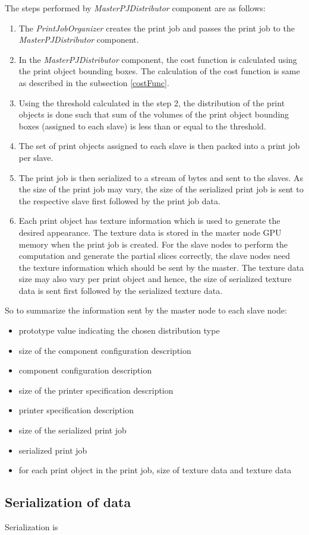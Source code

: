 The steps performed by \textit{MasterPJDistributor} component are as follows: 
\begin{enumerate}
\item The \textit{PrintJobOrganizer} creates the print job and passes the print job to the \textit{MasterPJDistributor} component. 
\item In the \textit{MasterPJDistributor} component, the cost function is calculated using the print object bounding boxes. The calculation of the cost function is same as described in the subsection \ref{costFunc}.
\item Using the threshold calculated in the step 2, the distribution of the print objects is done such that sum of the volumes of the print object bounding boxes (assigned to each slave) is less than or equal to the threshold.
\item The set of print objects assigned to each slave is then packed into a print job per slave. 
\item The print job is then serialized to a stream of bytes and sent to the slaves. As the size of the print job may vary, the size of the serialized print job is sent to the respective slave first followed by the print job data. 
\item Each print object has texture information which is used to generate the desired appearance. The texture data is stored in the master node GPU memory when the print job is created. For the slave nodes to perform the computation and generate the partial slices correctly, the slave nodes need the texture information which should be sent by the master. The texture data size may also vary per print object and hence, the size of serialized texture data is sent first followed by the serialized texture data.   
\end{enumerate}

So to summarize the information sent by the master node to each slave node:
\begin{itemize}
\item prototype value indicating the chosen distribution type
\item size of the component configuration description 
\item component configuration description
\item size of the printer specification description 
\item printer specification description
\item size of the serialized print job 
\item serialized print job 
\item for each print object in the print job, size of texture data and texture data  
\end{itemize}

\subsection{Serialization of data}
Serialization is 